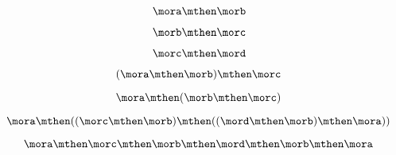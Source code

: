 {\begin{forslides}
        \begin{equation}
            \label{eq:08}
            \mora \mthen \morb
        \end{equation}

        \begin{equation}
            \label{eq:09}
            \morb \mthen \morc
        \end{equation}

        \begin{equation}
            \label{eq:10}
            \morc \mthen \mord
        \end{equation}

        \begin{equation}
            \label{eq:11}
            (\mora \mthen \morb) \mthen \morc
        \end{equation}

        \begin{equation}
            \label{eq:12}
            \mora \mthen  (\morb \mthen \morc )
        \end{equation}

        \begin{equation}
            \label{eq:13}
            \mora \mthen  ((\morc \mthen \morb ) \mthen (( \mord \mthen \morb ) \mthen \mora ))
        \end{equation}

        \begin{equation}
            \label{eq:14}
            \mora \mthen  \morc \mthen \morb  \mthen \mord \mthen \morb  \mthen \mora
        \end{equation}


\end{forslides}}
